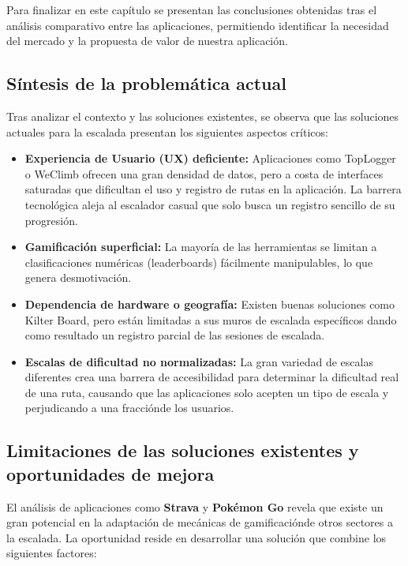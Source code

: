 Para finalizar en este capítulo se presentan las conclusiones obtenidas tras el análisis comparativo entre las aplicaciones, permitiendo identificar la necesidad del mercado y la propuesta de valor de nuestra aplicación.

\subsection{Síntesis de la problemática actual}

Tras analizar el contexto y las soluciones existentes, se observa que las soluciones actuales para la escalada presentan los siguientes aspectos críticos:

\begin{itemize}
\item \textbf{Experiencia de Usuario (UX) deficiente:} Aplicaciones como TopLogger o WeClimb ofrecen una gran densidad de datos, pero a costa de interfaces saturadas que dificultan el uso y registro de rutas en la aplicación. La barrera tecnológica aleja al escalador casual que solo busca un registro sencillo de su progresión.

\item \textbf{Gamificación superficial:} La mayoría de las herramientas se limitan a clasificaciones numéricas (leaderboards) fácilmente manipulables, lo que genera desmotivación.

\item \textbf{Dependencia de hardware o geografía:} Existen buenas soluciones como Kilter Board, pero están limitadas a sus muros de escalada específicos dando como resultado un registro parcial de las sesiones de escalada.

\item \textbf{Escalas de dificultad no normalizadas:} La gran variedad de escalas diferentes crea una barrera de accesibilidad para determinar la dificultad real de una ruta, causando que las aplicaciones solo acepten un tipo de escala y perjudicando a una fracciónde los usuarios.
\end{itemize}

\subsection{Limitaciones de las soluciones existentes y oportunidades de mejora}

El análisis de aplicaciones como \textbf{Strava} y \textbf{Pokémon Go} revela que existe un gran potencial en la adaptación de mecánicas de gamificaciónde otros sectores a la escalada. La oportunidad reside en desarrollar una solución que combine los siguientes factores:

